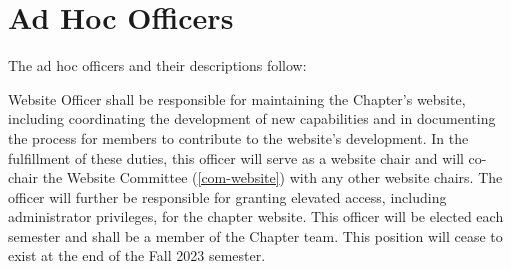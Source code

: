 \section{Ad Hoc Officers}\label{sec:AdHocOfficers} The ad hoc officers and their descriptions follow:\\
\begin{enumsubsection}



\item{Website Officer} shall  be  responsible for maintaining the Chapter's website,   including coordinating the development of new capabilities and in documenting the process for members to contribute to the website's development. In the fulfillment of these duties, this officer will serve as a website chair and will co-chair the Website Committee (\ref{com-website}) with any other website chairs. The officer will further be responsible for granting elevated access, including administrator privileges, for the chapter website. This officer will be elected each semester and shall be a member of the Chapter team. This position will cease to exist at the end of the Fall 2023 semester. \label{officer-website}  %


\end{enumsubsection}


